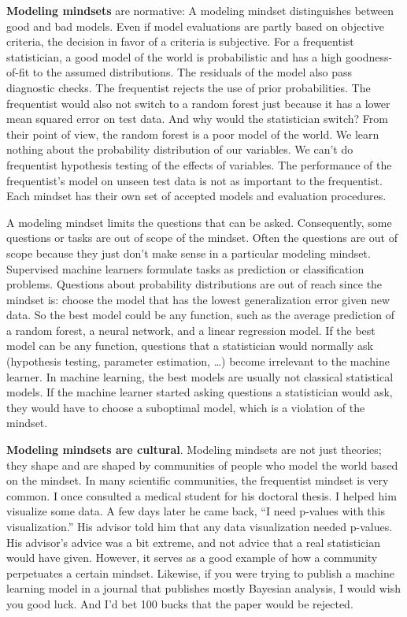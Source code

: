 \documentclass[
  10pt,
]{scrbook}
\begin{document}
\textbf{Modeling mindsets} are normative:
A modeling mindset distinguishes between good and bad models.
Even if model evaluations are partly based on objective criteria, the decision in favor of a criteria is subjective.
For a frequentist statistician, a good model of the world is probabilistic and has a high goodness-of-fit to the assumed distributions.
The residuals of the model also pass diagnostic checks.
The frequentist rejects the use of prior probabilities.
The frequentist would also not switch to a random forest just because it has a lower mean squared error on test data.
And why would the statistician switch?
From their point of view, the random forest is a poor model of the world.
We learn nothing about the probability distribution of our variables.
We can't do frequentist hypothesis testing of the effects of variables.
The performance of the frequentist's model on unseen test data is not as important to the frequentist.
Each mindset has their own set of accepted models and evaluation procedures.

A modeling mindset limits the questions that can be asked.
Consequently, some questions or tasks are out of scope of the mindset.
Often the questions are out of scope because they just don't make sense in a particular modeling mindset.
Supervised machine learners formulate tasks as prediction or classification problems.
Questions about probability distributions are out of reach since the mindset is: choose the model that has the lowest generalization error given new data.
So the best model could be any function, such as the average prediction of a random forest, a neural network, and a linear regression model.
If the best model can be any function, questions that a statistician would normally ask (hypothesis testing, parameter estimation, \ldots) become irrelevant to the machine learner.
In machine learning, the best models are usually not classical statistical models.
If the machine learner started asking questions a statistician would ask, they would have to choose a suboptimal model, which is a violation of the mindset.

\textbf{Modeling mindsets are cultural}.
Modeling mindsets are not just theories; they shape and are shaped by communities of people who model the world based on the mindset.
In many scientific communities, the frequentist mindset is very common.
I once consulted a medical student for his doctoral thesis.
I helped him visualize some data.
A few days later he came back, ``I need p-values with this visualization.''
His advisor told him that any data visualization needed p-values.
His advisor's advice was a bit extreme, and not advice that a real statistician would have given.
However, it serves as a good example of how a community perpetuates a certain mindset.
Likewise, if you were trying to publish a machine learning model in a journal that publishes mostly Bayesian analysis, I would wish you good luck.
And I'd bet 100 bucks that the paper would be rejected.
\end{document}

